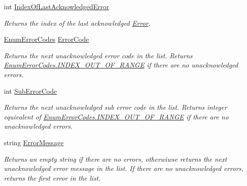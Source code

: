 \begin{DoxyCompactItemize}
int \mbox{\hyperlink{class_c_s_i_1_1_library_1_1_errors_1_1_error_list_a65417ed23dba71f8a5b2ea93434e4216}{Index\+Of\+Last\+Acknowledged\+Error}}
\begin{DoxyCompactList}\small\item\em Returns the index of the last acknowledged \mbox{\hyperlink{class_c_s_i_1_1_library_1_1_errors_1_1_error}{Error}}. \end{DoxyCompactList}\item 
\mbox{\hyperlink{namespace_c_s_i_1_1_library_1_1_errors_a5534735de1ef2256eb4c52c7440e30d7}{Enum\+Error\+Codes}} \mbox{\hyperlink{class_c_s_i_1_1_library_1_1_errors_1_1_error_list_a08cc2b3cca8c52820e6258e0b14b7134}{Error\+Code}}
\begin{DoxyCompactList}\small\item\em Returns the next unacknowledged error code in the list. Returns \mbox{\hyperlink{namespace_c_s_i_1_1_library_1_1_errors_a5534735de1ef2256eb4c52c7440e30d7a577cf42cc2eae1cffef0f749c6c08787}{Enum\+Error\+Codes.\+I\+N\+D\+E\+X\+\_\+\+O\+U\+T\+\_\+\+O\+F\+\_\+\+R\+A\+N\+GE}} if there are no unacknowledged errors. \end{DoxyCompactList}\item 
int \mbox{\hyperlink{class_c_s_i_1_1_library_1_1_errors_1_1_error_list_acd5490889a4102649bc9c22ce11958b7}{Sub\+Error\+Code}}
\begin{DoxyCompactList}\small\item\em Returns the next unacknowledged sub error code in the list. Returns integer equivalent of \mbox{\hyperlink{namespace_c_s_i_1_1_library_1_1_errors_a5534735de1ef2256eb4c52c7440e30d7a577cf42cc2eae1cffef0f749c6c08787}{Enum\+Error\+Codes.\+I\+N\+D\+E\+X\+\_\+\+O\+U\+T\+\_\+\+O\+F\+\_\+\+R\+A\+N\+GE}} if there are no unacknowledged errors. \end{DoxyCompactList}\item 
string \mbox{\hyperlink{class_c_s_i_1_1_library_1_1_errors_1_1_error_list_aac79c17f059cd69f3882177c740539c3}{Error\+Message}}
\begin{DoxyCompactList}\small\item\em Returns an empty string if there are no errors, otherwiwse returns the next unacknowledged error message in the list. If there are no unacknowledged errors, returns the first error in the list. \end{DoxyCompactList}\end{DoxyCompactItemize}


